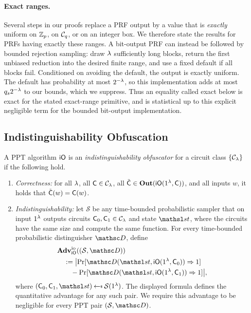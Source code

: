 \paragraph*{Exact ranges.} Several steps in our proofs replace a PRF output by a value that is \emph{exactly} uniform on $\mathbb Z_p$, on $\mathcal{C}_q$, or on an integer box. We therefore state the results for PRFs having exactly these ranges. A bit-output PRF can instead be followed by bounded rejection sampling: draw $\lambda$ sufficiently long blocks, return the first unbiased reduction into the desired finite range, and use a fixed default if all blocks fail. Conditioned on avoiding the default, the output is exactly uniform. The default has probability at most $2^{-\lambda}$, so this implementation adds at most $q_s2^{-\lambda}$ to our bounds, which we suppress. Thus an equality called exact below is exact for the stated exact-range primitive, and is statistical up to this explicit negligible term for the bounded bit-output implementation.

\subsection{Indistinguishability Obfuscation} \label{sec-io}

\begin{definition} \label{def-io}
A PPT algorithm $\mathsf{iO}$ is an \emph{indistinguishability obfuscator} for a circuit class $\{\mathcal{C}_\lambda\}$ if the following hold.
\begin{enumerate}
\item \emph{Correctness:} for all $\lambda$, all $\mathsf{C} \in \mathcal{C}_\lambda$, all $\tilde{\mathsf{C}} \in \mathbf{Out}(\mathsf{iO}(1^{\lambda}, \mathsf{C}))$, and all inputs $w$, it holds that $\tilde{\mathsf{C}}(w) = \mathsf{C}(w)$.
\item \emph{Indistinguishability:} let $\mathcal{S}$ be any time-bounded probabilistic sampler that on input $1^{\lambda}$ outputs circuits $\mathsf{C}_0,\mathsf{C}_1\in\mathcal{C}_\lambda$ and state $\state$, where the circuits have the same size and compute the same function. For every time-bounded probabilistic distinguisher $\advD$, define
$$
\begin{aligned}
&\AdvIO{\iO}{(\mathcal S,\advD)}\\
&\quad:=
\bigl|
\Pr[\advD(\state,\iO(\usecp,\CircC_0))\Rightarrow1]
\\[-0.25ex]
&\qquad-
\Pr[\advD(\state,\iO(\usecp,\CircC_1))\Rightarrow1]
\bigr|,
\end{aligned}
$$
where $(\CircC_0,\CircC_1,\state)\getsr\mathcal{S}(\usecp)$. The displayed formula defines the quantitative advantage for any such pair. We require this advantage to be negligible for every PPT pair $(\mathcal S,\advD)$.
\end{enumerate}
\end{definition}

